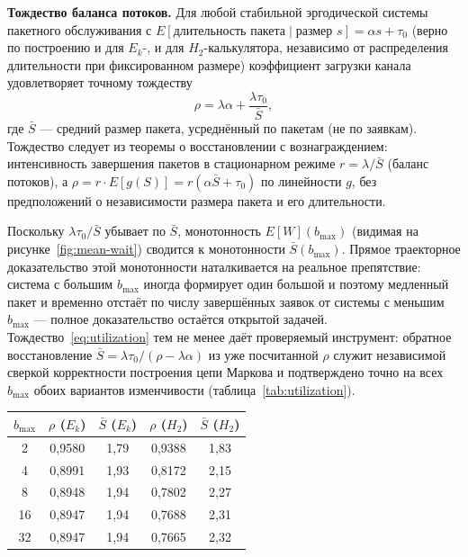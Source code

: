 \documentclass[12pt,a4paper]{article}
\begin{document}
\noindent\textbf{Тождество баланса потоков.} Для любой стабильной эргодической системы пакетного обслуживания с $E[\text{длительность пакета}\mid\text{размер } s]=\alpha s+\tau_0$ (верно по построению и для $E_k$-, и для $H_2$-калькулятора, независимо от распределения длительности при фиксированном размере) коэффициент загрузки канала удовлетворяет точному тождеству
\begin{equation}
\rho = \lambda\alpha + \frac{\lambda\tau_0}{\bar S},
\label{eq:utilization}
\end{equation}
где $\bar S$ --- средний размер пакета, усреднённый по пакетам (не по заявкам). Тождество следует из теоремы о восстановлении с вознаграждением: интенсивность завершения пакетов в стационарном режиме $r=\lambda/\bar S$ (баланс потоков), а $\rho=r\cdot E[g(S)]=r(\alpha\bar S+\tau_0)$ по линейности $g$, без предположений о независимости размера пакета и его длительности.

Поскольку $\lambda\tau_0/\bar S$ убывает по $\bar S$, монотонность $E[W](b_{\max})$ (видимая на рисунке~\ref{fig:mean-wait}) сводится к монотонности $\bar S(b_{\max})$. Прямое траекторное доказательство этой монотонности наталкивается на реальное препятствие: система с большим $b_{\max}$ иногда формирует один большой и поэтому медленный пакет и временно отстаёт по числу завершённых заявок от системы с меньшим $b_{\max}$ --- полное доказательство остаётся открытой задачей. Тождество~\eqref{eq:utilization} тем не менее даёт проверяемый инструмент: обратное восстановление $\bar S=\lambda\tau_0/(\rho-\lambda\alpha)$ из уже посчитанной $\rho$ служит независимой сверкой корректности построения цепи Маркова и подтверждено точно на всех $b_{\max}$ обоих вариантов изменчивости (таблица~\ref{tab:utilization}).

\begin{center}
\label{tab:utilization}
\begin{tabular}{|c|c|c|c|c|}
\hline
$b_{\max}$ & $\rho$ ($E_k$) & $\bar S$ ($E_k$) & $\rho$ ($H_2$) & $\bar S$ ($H_2$) \\
\hline
2  & 0,9580 & 1,79 & 0,9388 & 1,83 \\
4  & 0,8991 & 1,93 & 0,8172 & 2,15 \\
8  & 0,8948 & 1,94 & 0,7802 & 2,27 \\
16 & 0,8947 & 1,94 & 0,7688 & 2,31 \\
32 & 0,8947 & 1,94 & 0,7665 & 2,32 \\
\hline
\end{tabular}
\end{center}
\end{document}
